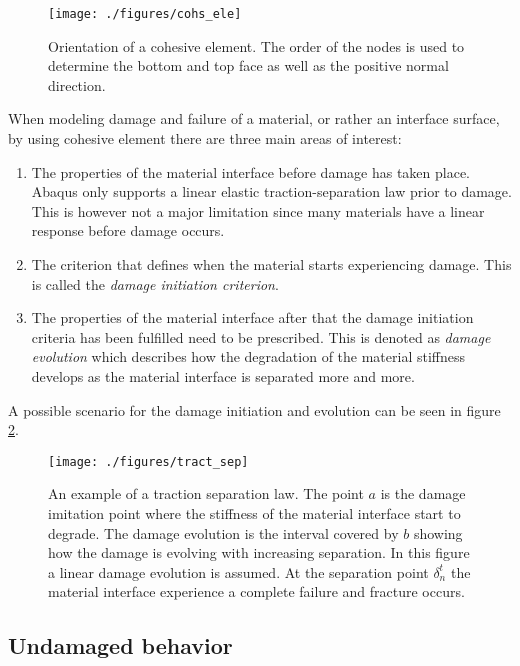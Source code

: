 \documentclass[grain_boundary_law.tex]{subfiles}
\begin{document}
\begin{figure}[htpb!]
\centering
 \texttt{[image: ./figures/cohs\_ele]}
\caption{Orientation of a cohesive element. The order of the nodes is used to determine the bottom and top face as well as the positive normal direction.}
\label{fig:cohs_ori}
\end{figure}


When modeling damage and failure of a material, or rather an interface surface, by using cohesive element there are three main areas of interest:
\begin{enumerate}
\item The properties of the material interface before damage has taken place. Abaqus only supports a linear elastic traction-separation law prior to damage. This is however not a major limitation since many materials have a linear response before damage occurs. 

\item The criterion that defines when the material starts experiencing damage. This is called the \textit{damage initiation criterion}.

\item The properties of the material interface after that the damage initiation criteria has been fulfilled need to be prescribed. This is denoted as \textit{damage evolution} which describes how the degradation of the material stiffness develops as the material interface is separated more and more.
\end{enumerate}
%
A possible scenario for the damage initiation and evolution can be seen in figure \ref{fig:tract_sep}.

\begin{figure}[htpb!]
\centering
  \texttt{[image: ./figures/tract\_sep]}
\caption{An example of a traction separation law. The point $a$ is the damage imitation point where the stiffness of the material interface start to degrade. The damage evolution is the interval covered by $b$ showing how the damage is evolving with increasing separation. In this figure a linear damage evolution is assumed. At the separation point $\delta_n^t$ the material interface experience a complete failure and fracture occurs.}
\label{fig:tract_sep}
\end{figure}

\subsection{Undamaged behavior}
 
\end{document}
